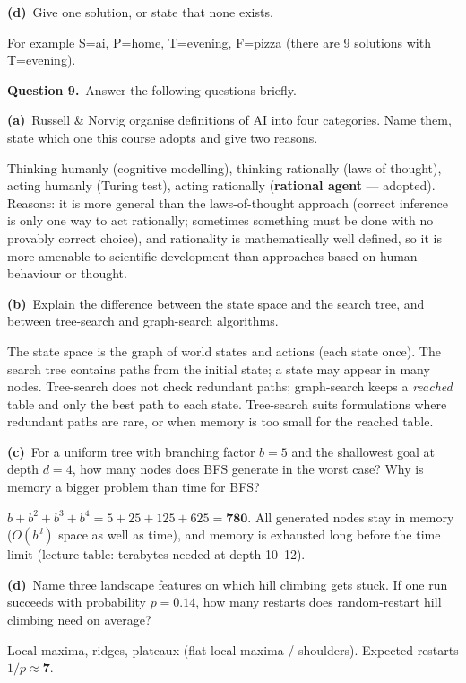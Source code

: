 \documentclass[11pt,a4paper]{article}
\newcommand{\question}[1]{\par\medskip\noindent\textbf{Question #1.}\ }
\newcommand{\subq}[1]{\par\smallskip\noindent\textbf{#1}\ }
\begin{document}
\subq{(d)}Give one solution, or state that none exists.
\begin{solbox}
For example S=ai, P=home, T=evening, F=pizza (there are 9 solutions with T=evening).
\end{solbox}
\question{9}Answer the following questions briefly.
\subq{(a)}Russell \& Norvig organise definitions of AI into four categories. Name them, state which one this course adopts and give two reasons.
\begin{solbox}
Thinking humanly (cognitive modelling), thinking rationally (laws of thought), acting humanly (Turing test), acting rationally (\textbf{rational agent} --- adopted). Reasons: it is more general than the laws-of-thought approach (correct inference is only one way to act rationally; sometimes something must be done with no provably correct choice), and rationality is mathematically well defined, so it is more amenable to scientific development than approaches based on human behaviour or thought.
\end{solbox}
\subq{(b)}Explain the difference between the state space and the search tree, and between tree-search and graph-search algorithms.
\begin{solbox}
The state space is the graph of world states and actions (each state once). The search tree contains paths from the initial state; a state may appear in many nodes. Tree-search does not check redundant paths; graph-search keeps a \emph{reached} table and only the best path to each state. Tree-search suits formulations where redundant paths are rare, or when memory is too small for the reached table.
\end{solbox}
\subq{(c)}For a uniform tree with branching factor $b=5$ and the shallowest goal at depth $d=4$, how many nodes does BFS generate in the worst case? Why is memory a bigger problem than time for BFS?
\begin{solbox}
$b+b^2+b^3+b^4=5+25+125+625=\mathbf{780}$. All generated nodes stay in memory ($O(b^d)$ space as well as time), and memory is exhausted long before the time limit (lecture table: terabytes needed at depth 10--12).
\end{solbox}
\subq{(d)}Name three landscape features on which hill climbing gets stuck. If one run succeeds with probability $p=0.14$, how many restarts does random-restart hill climbing need on average?
\begin{solbox}
Local maxima, ridges, plateaux (flat local maxima / shoulders). Expected restarts $1/p\approx\mathbf{7}$.
\end{solbox}
\end{document}
